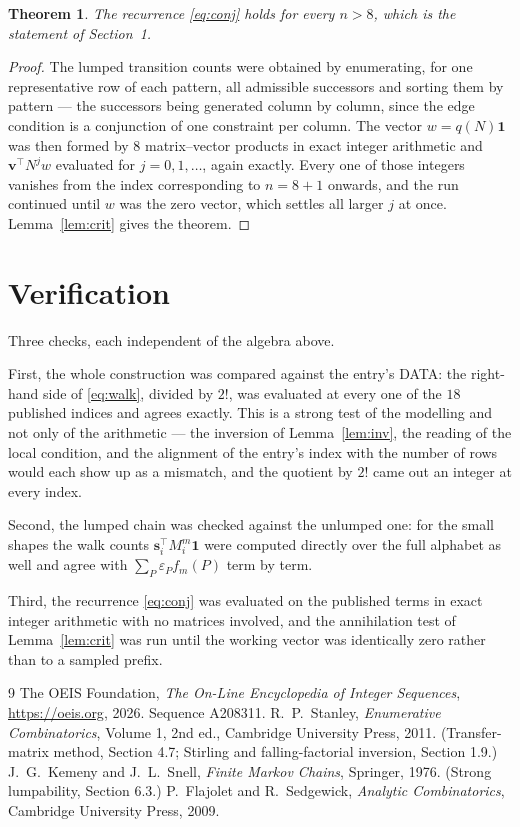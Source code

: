 \documentclass[11pt,a4paper]{article}
\theoremstyle{plain}
\newtheorem{theorem}{Theorem}
\theoremstyle{definition}
\begin{document}
\begin{theorem}
The recurrence \eqref{eq:conj} holds for every $n>8$, which is the statement of
Section~1.
\end{theorem}

\begin{proof}
The lumped transition counts were obtained by enumerating, for one representative row of
each pattern, all admissible successors and sorting them by pattern --- the successors being
generated column by column, since the edge condition is a conjunction of one constraint per
column. The vector $w=q(N)\mathbf{1}$ was then formed by $8$ matrix--vector products
in exact integer arithmetic and $\mathbf{v}^{\!\top}N^{j}w$ evaluated for
$j=0,1,\dots$, again exactly. Every one of those integers vanishes from the index
corresponding to $n=8+1$ onwards, and the run continued until $w$ was the zero vector,
which settles all larger $j$ at once. Lemma~\ref{lem:crit} gives the theorem.
\end{proof}

\section{Verification}

Three checks, each independent of the algebra above.

First, the whole construction was compared against the entry's DATA: the right-hand side of
\eqref{eq:walk}, divided by $2!$, was evaluated at every one of the $18$
published indices and agrees exactly. This is a strong test of the modelling and not only of
the arithmetic --- the inversion of Lemma~\ref{lem:inv}, the reading of the local
condition, and the alignment of the entry's index with the number of rows would each
show up as a mismatch, and the quotient by $2!$ came out an integer at every index.

Second, the lumped chain was checked against the unlumped one: for the small shapes the walk
counts $\mathbf{s}_i^{\!\top}M_i^{m}\mathbf{1}$ were computed directly over the full
alphabet as well and agree with $\sum_P\varepsilon_Pf_m(P)$ term by term.

Third, the recurrence \eqref{eq:conj} was evaluated on the published terms in exact integer
arithmetic with no matrices involved, and the annihilation test of Lemma~\ref{lem:crit} was
run until the working vector was identically zero rather than to a sampled prefix.

\begin{thebibliography}{9}
 The OEIS Foundation, \emph{The On-Line Encyclopedia of Integer
Sequences}, \url{https://oeis.org}, 2026. Sequence A208311.
 R.~P.~Stanley, \emph{Enumerative Combinatorics}, Volume 1, 2nd ed.,
Cambridge University Press, 2011. (Transfer-matrix method, Section 4.7; Stirling and
falling-factorial inversion, Section 1.9.)
 J.~G.~Kemeny and J.~L.~Snell, \emph{Finite Markov Chains}, Springer,
1976. (Strong lumpability, Section 6.3.)
 P.~Flajolet and R.~Sedgewick, \emph{Analytic Combinatorics}, Cambridge
University Press, 2009.
\end{thebibliography}
\end{document}
